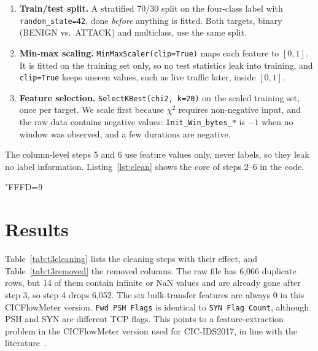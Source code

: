 \begin{enumerate}
	\item \textbf{Train/test split.} A stratified 70/30 split on the four-class label with \texttt{random\_state=42}, done \emph{before} anything is fitted. Both targets, binary (BENIGN vs.\ ATTACK) and multiclass, use the same split.
	\item \textbf{Min-max scaling.} \texttt{MinMaxScaler(clip=True)} maps each feature to $[0,1]$. It is fitted on the training set only, so no test statistics leak into training, and \texttt{clip=True} keeps unseen values, such as live traffic later, inside $[0,1]$.
	\item \textbf{Feature selection.} \texttt{SelectKBest(chi2, k=20)} on the scaled training set, once per target. We scale first because $\chi^2$ requires non-negative input, and the raw data contains negative values: \texttt{Init\_Win\_bytes\_*} is $-1$ when no window was observed, and a few durations are negative.
\end{enumerate}

The column-level steps 5 and 6 use feature values only, never labels, so they leak no label information. Listing~\ref{lst:clean} shows the core of steps 2--6 in the code.

{\catcode"FFFD=9 }

\section{Results}\label{sec:t3-results}

Table~\ref{tab:t3cleaning} lists the cleaning steps with their effect, and Table~\ref{tab:t3removed} the removed columns. The raw file has 6,066 duplicate rows, but 14 of them contain infinite or NaN values and are already gone after step 3, so step 4 drops 6,052. The six bulk-transfer features are always 0 in this CICFlowMeter version. \texttt{Fwd PSH Flags} is identical to \texttt{SYN Flag Count}, although PSH and SYN are different TCP flags. This points to a feature-extraction problem in the CICFlowMeter version used for CIC-IDS2017, in line with the literature~\cite{engelen2021troubleshooting}.

\begin{table}[ht]
	\centering\small
	
	\caption{Cleaning steps. The column counts include the \texttt{Label} column, so the 61 remaining columns are 60 features plus \texttt{Label}. Loading and label fixing happen before step 1.}
	\label{tab:t3cleaning}
\end{table}

